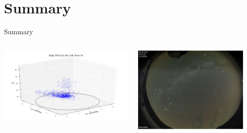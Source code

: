 \section{Summary}



\begin{frame}[t]{Summary}
    \begin{columns}[onlytextwidth]
        \begin{column}{0.3\textwidth}
            \includegraphics[width=1.2\textwidth]{fig/event1.png}
        \end{column}
        \begin{column}{0.3\textwidth}
            \includegraphics[width=\textwidth]{fig/cond.png}
        \end{column}
        \begin{column}{0.3\textwidth}

\end{column}
\end{columns}
\end{frame}
